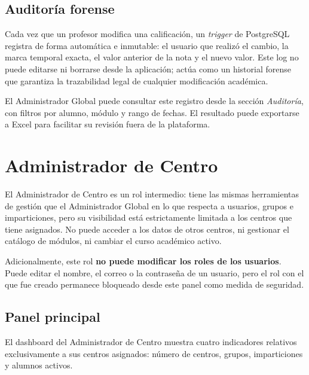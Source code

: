\documentclass[12pt, a4paper]{report}
\begin{document}

\subsection{Auditoría forense}

Cada vez que un profesor modifica una calificación, un \textit{trigger} de PostgreSQL
registra de forma automática e inmutable: el usuario que realizó el cambio, la marca
temporal exacta, el valor anterior de la nota y el nuevo valor. Este log no puede
editarse ni borrarse desde la aplicación; actúa como un historial forense que garantiza
la trazabilidad legal de cualquier modificación académica.

El Administrador Global puede consultar este registro desde la sección
\textit{Auditoría}, con filtros por alumno, módulo y rango de fechas. El resultado puede
exportarse a Excel para facilitar su revisión fuera de la plataforma.


\section{Administrador de Centro}

El Administrador de Centro es un rol intermedio: tiene las mismas herramientas de gestión
que el Administrador Global en lo que respecta a usuarios, grupos e imparticiones, pero
su visibilidad está estrictamente limitada a los centros que tiene asignados. No puede
acceder a los datos de otros centros, ni gestionar el catálogo de módulos, ni cambiar el
curso académico activo.

Adicionalmente, este rol \textbf{no puede modificar los roles de los usuarios}. Puede
editar el nombre, el correo o la contraseña de un usuario, pero el rol con el que fue
creado permanece bloqueado desde este panel como medida de seguridad.

\subsection{Panel principal}

El dashboard del Administrador de Centro muestra cuatro indicadores relativos
exclusivamente a sus centros asignados: número de centros, grupos, imparticiones y
alumnos activos.
\end{document}
